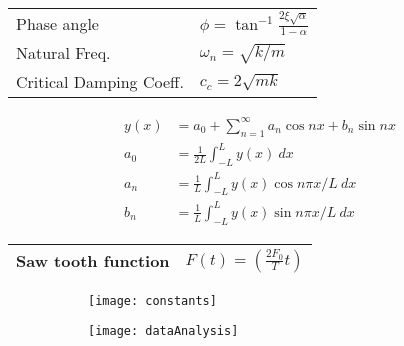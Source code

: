 \documentclass[main.tex]{subfile}
\begin{document}
\begin{table}[H]
  \begin{center}
    \begin{tabular}{ll}
      \\ \toprule
			Phase angle & $\phi = \tan^{-1}{\frac{2\xi\sqrt{\alpha}}{1-\alpha}}$
			\\Natural Freq. & $\omega_n = \sqrt{k/m}$
			\\Critical Damping Coeff. & $c_c = 2\sqrt{mk}$
      \\ \bottomrule
    \end{tabular}
  \end{center}
\end{table}




\begin{align}
	y(x)  &= a_0 + \sum_{n=1}^{\infty} a_n\cos{nx} + b_n\sin{nx}
	\\a_0 &= \frac{1}{2L} \int_{-L}^{L} y(x)\ dx
	\\a_n &= \frac{1}{L} \int_{-L}^{L} y(x) \cos{n\pi x / L}\ dx
	\\b_n &= \frac{1}{L} \int_{-L}^{L} y(x) \sin{n\pi x / L}\ dx
\end{align}



\begin{table}[H]
  \begin{center}
    \begin{tabular}{ll}
      \\ \toprule
			Saw tooth function & $F(t) = (\frac{2F_0}{T}t) $
      \\ \bottomrule
    \end{tabular}
  \end{center}
\end{table}

\begin{figure}
	\centering
	\begin{subfigure}{.5\linewidth}
		\centering
		\texttt{[image: constants]}
	\end{subfigure}%
	\begin{subfigure}{.5\linewidth}
		\centering
		\texttt{[image: dataAnalysis]}
	\end{subfigure}
\end{figure}



\end{document}
